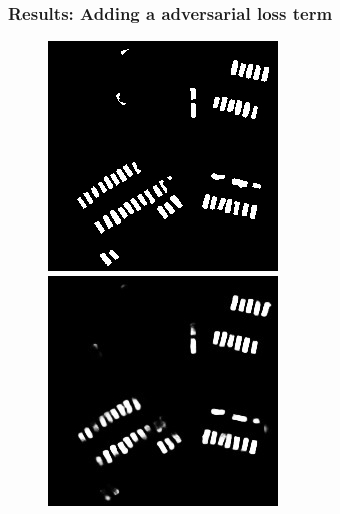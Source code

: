 \documentclass[aspectratio=1610]{beamer}
\begin{document}
\begin{frame}
  \frametitle{\hfill Results: Adding a adversarial loss term}
\begin{figure}[H]
  \includegraphics[width=\linewidth]{gan_vs_class/label_2}
\endminipage\hfill
{}
  \includegraphics[width=\linewidth]{gan_vs_class/class_2}

\end{figure}
\end{frame}
\end{document}
